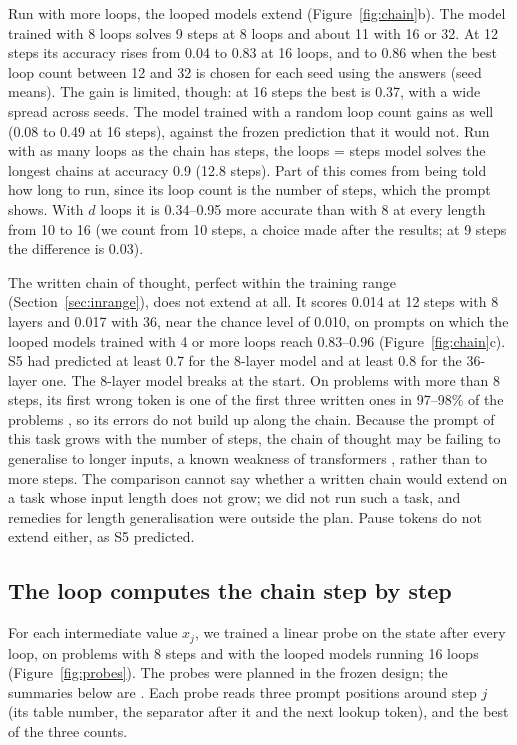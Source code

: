Run with more loops, the looped models extend (Figure~\ref{fig:chain}b). The model trained with 8 loops solves 9 steps
at 8 loops and about 11 with 16 or 32. At 12 steps its accuracy rises from 0.04 to 0.83 at 16 loops, and to 0.86 when
the best loop count between 12 and 32 is chosen for each seed using the answers (seed means). The gain is limited,
though: at 16 steps the best is 0.37, with a wide spread across seeds. The model trained with a random loop count gains
as well (0.08 to 0.49 at 16 steps), against the frozen prediction that it would not. Run with as many loops as the
chain has steps, the loops = steps model solves the longest chains at accuracy 0.9 (12.8 steps). Part of this comes
from being told how long to run, since its loop count is the number of steps, which the prompt shows. With $d$ loops it
is 0.34--0.95 more accurate than with 8 at every length from 10 to 16 (we count from 10 steps, a choice made after the
results; at 9 steps the difference is 0.03).

The written chain of thought, perfect within the training range (Section~\ref{sec:inrange}), does not extend at all.
It scores 0.014 at 12 steps with 8 layers and 0.017 with 36, near the chance level of 0.010, on prompts on which the
looped models trained with 4 or more loops reach 0.83--0.96 (Figure~\ref{fig:chain}c). S5 had predicted at least 0.7
for the 8-layer model and at least 0.8 for the 36-layer one. The 8-layer model breaks at the start. On problems with
more than 8 steps, its first wrong token is one of the first three written ones in 97--98\% of the problems
, so its errors do not build up along the chain. Because the prompt of this task grows with the
number of steps, the chain of thought may be failing to generalise to longer inputs, a known weakness of transformers
\citep{zhou2024transformers,cho2024position}, rather than to more steps. The comparison cannot say whether a written
chain would extend on a task whose input length does not grow; we did not run such a task, and remedies for length
generalisation were outside the plan. Pause tokens do not extend either, as S5 predicted.

\subsection{The loop computes the chain step by step}
\label{sec:probes}

For each intermediate value $x_j$, we trained a linear probe on the state after every loop, on problems with 8 steps
and with the looped models running 16 loops (Figure~\ref{fig:probes}). The probes were planned in the frozen design;
the summaries below are . Each probe reads three prompt positions around step $j$ (its table number,
the separator after it and the next lookup token), and the best of the three counts.

